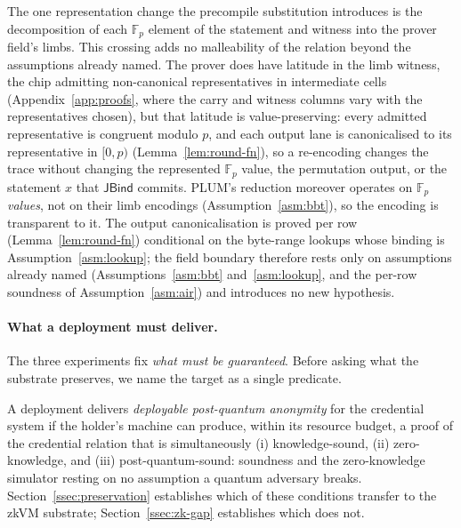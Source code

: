 \begin{remark}\label{rem:field-boundary}
The one representation change the precompile substitution introduces is the decomposition of each $\mathbb{F}_p$ element of the statement and witness into the prover field's limbs. This crossing adds no malleability of the relation beyond the assumptions already named. The prover does have latitude in the limb witness, the chip admitting non-canonical representatives in intermediate cells (Appendix~\ref{app:proofs}, where the carry and witness columns vary with the representatives chosen), but that latitude is value-preserving: every admitted representative is congruent modulo $p$, and each output lane is canonicalised to its representative in $[0,p)$ (Lemma~\ref{lem:round-fn}), so a re-encoding changes the trace without changing the represented $\mathbb{F}_p$ value, the permutation output, or the statement $x$ that $\mathsf{JBind}$ commits. PLUM's reduction moreover operates on $\mathbb{F}_p$ \emph{values}, not on their limb encodings (Assumption~\ref{asm:bbt}), so the encoding is transparent to it. The output canonicalisation is proved per row (Lemma~\ref{lem:round-fn}) conditional on the byte-range lookups whose binding is Assumption~\ref{asm:lookup}; the field boundary therefore rests only on assumptions already named (Assumptions~\ref{asm:bbt} and~\ref{asm:lookup}, and the per-row soundness of Assumption~\ref{asm:air}) and introduces no new hypothesis.
\end{remark}

\paragraph{What a deployment must deliver.}
The three experiments fix \emph{what must be guaranteed}. Before asking what the substrate preserves, we name the target as a single predicate.

\begin{definition}\label{def:deployable}
    A deployment delivers \emph{deployable post-quantum anonymity} for the credential system if the holder's machine can produce, within its resource budget, a proof of the credential relation that is simultaneously (i) knowledge-sound, (ii) zero-knowledge, and (iii) post-quantum-sound: soundness and the zero-knowledge simulator resting on no assumption a quantum adversary breaks. Section~\ref{ssec:preservation} establishes which of these conditions transfer to the zkVM substrate; Section~\ref{ssec:zk-gap} establishes which does not.
\end{definition}

